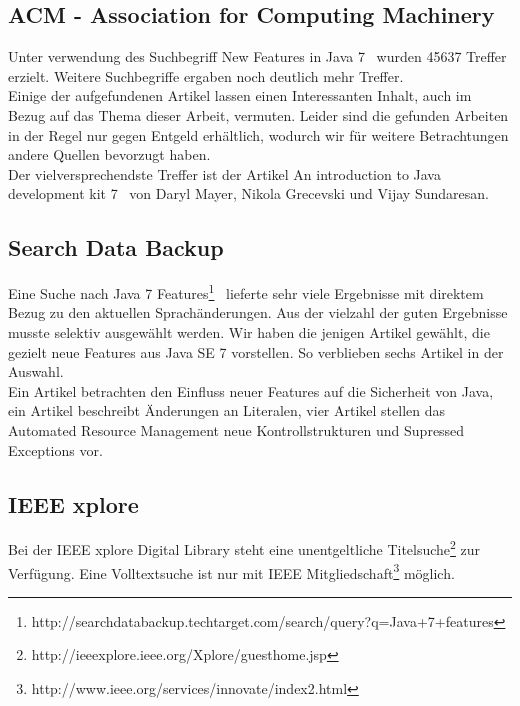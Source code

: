 \subsection{ACM - Association for Computing Machinery}
Unter verwendung des Suchbegriff \glqq New Features in Java 7 \grqq ~wurden 45637 Treffer erzielt.
Weitere Suchbegriffe ergaben noch deutlich mehr Treffer.\\

Einige der aufgefundenen Artikel lassen einen Interessanten Inhalt, auch im Bezug auf das Thema dieser Arbeit, vermuten. Leider sind die gefunden Arbeiten in der Regel nur gegen Entgeld erhältlich, wodurch wir für weitere Betrachtungen andere Quellen bevorzugt haben.\\

Der vielversprechendste Treffer ist der Artikel \glqq An introduction to Java development kit 7 \grqq\cite{acmJava7} ~von Daryl Mayer, Nikola Grecevski und Vijay Sundaresan.

\subsection{Search Data Backup}
Eine Suche nach \glqq Java 7 Features\grqq\footnote{http://searchdatabackup.techtarget.com/search/query?q=Java+7+features} ~lieferte sehr viele Ergebnisse mit direktem Bezug zu den aktuellen Sprachänderungen. Aus der vielzahl der guten Ergebnisse musste selektiv ausgewählt werden. Wir haben die jenigen Artikel gewählt, die gezielt neue Features aus Java SE 7 vorstellen. So verblieben sechs Artikel in der Auswahl.\\

Ein Artikel\cite{sbJ7ImproveSec} betrachten den Einfluss neuer Features auf die Sicherheit von Java, ein Artikel\cite{sbJ7literals} beschreibt Änderungen an Literalen, vier Artikel stellen das Automated Resource Management\cite{sbJ7resources}\cite{sbJ7coin} neue Kontrollstrukturen\cite{sbJ7switch} und Supressed Exceptions\cite{sbJ7exeptions} vor.

\subsection{IEEE xplore}
Bei der IEEE xplore Digital Library steht eine unentgeltliche Titelsuche\footnote{http://ieeexplore.ieee.org/Xplore/guesthome.jsp} zur Verfügung. Eine Volltextsuche ist nur mit IEEE Mitgliedschaft\footnote{http://www.ieee.org/services/innovate/index2.html} möglich.\\

